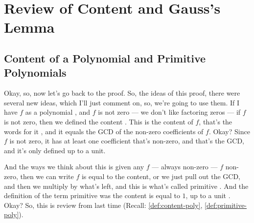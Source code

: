 \begin{hidden}
\end{hidden}

\section{Review of Content and Gauss's Lemma}

\subsection{Content of a Polynomial and Primitive Polynomials}

\begin{speech}[00:06:53 - 00:08:12]
Okay, so, now let's go back to the proof. So, the ideas of this proof, there were several new ideas, which I'll just comment on, so, we're going to use them. If I have $f$ as a polynomial , and $f$ is not zero  --- we don't like factoring zeros --- if $f$ is not zero, then we defined the content . This is the content of $f$, that's the words for it , and it equals the GCD of the non-zero coefficients of $f$. Okay? Since $f$ is not zero, it has at least one coefficient that's non-zero, and that's the GCD, and it's only defined up to a unit.

And the ways we think about this is given any $f$ --- always non-zero --- $f$ non-zero, then we can write $f$ is equal to the content, or we just pull out the GCD, and then we multiply by what's left, and this is what's called primitive . And the definition of the term primitive was the content is equal to $1$, up to a unit . Okay? So, this is review from last time (Recall: \cref{def:content-poly}, \cref{def:primitive-poly}).
\end{speech}


